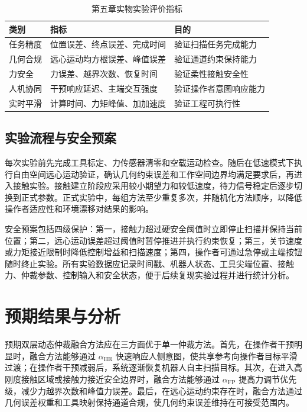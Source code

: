 \begin{table}[H]
\centering
\caption{第五章实物实验评价指标}
\label{tab:ch5_real_metrics}
\begin{tabular}{lll}
\toprule
类别 & 指标 & 目的 \\
\midrule
任务精度 & 位置误差、终点误差、完成时间 & 验证扫描任务完成能力 \\
几何合规 & 远心运动均方根误差、峰值误差 & 验证通道约束保持能力 \\
力安全 & 力误差、越界次数、恢复时间 & 验证柔性接触安全性 \\
人机协同 & 干预响应延迟、主端交互强度 & 验证操作者意图响应能力 \\
实时平滑 & 计算时间、力矩峰值、加加速度 & 验证工程可执行性 \\
\bottomrule
\end{tabular}
\end{table}

\subsection{实验流程与安全预案}
\label{subsec:ch5_protocol}

每次实验前先完成工具标定、力传感器清零和空载运动检查。随后在低速模式下执行自由空间远心运动验证，确认几何约束误差和工作空间边界均满足要求后，再进入接触实验。接触建立阶段应采用较小期望力和较低速度，待力信号稳定后逐步切换到正式参数。正式实验中，每组方法至少重复多次，并随机化方法顺序，以降低操作者适应性和环境漂移对结果的影响。

安全预案包括四级保护：第一，接触力超过硬安全阈值时立即停止扫描并保持当前位置；第二，远心运动误差超过阈值时暂停推进并执行约束恢复；第三，关节速度或力矩接近限制时降低控制增益和扫描速度；第四，操作者可通过急停或主端按钮随时终止实验。所有实验数据应记录时间戳、机器人状态、工具尖端位置、接触力、仲裁参数、控制输入和安全状态，便于后续复现实验过程并进行统计分析。

\section{预期结果与分析}
\label{sec:ch5_expected}

预期双层动态仲裁融合方法应在三方面优于单一仲裁方法。首先，在操作者干预明显时，融合方法能够通过 $\alpha_{\mathrm{HR}}$ 快速响应人侧意图，使共享参考向操作者目标平滑过渡；在操作者干预减弱后，系统逐渐恢复机器人自主扫描目标。其次，在进入高刚度接触区域或接触力接近安全边界时，融合方法能够通过 $\alpha_{\mathrm{FP}}$ 提高力调节优先级，减少力越界次数和峰值力误差。最后，在远心运动约束存在时，融合方法通过几何误差权重和工具映射保持通道合规，使几何约束误差维持在可接受范围内。


